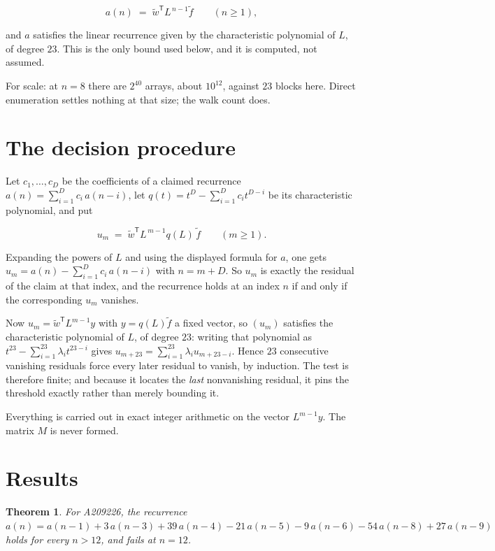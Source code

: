 \documentclass[11pt]{article}
\newtheorem{theorem}{Theorem}
\theoremstyle{definition}
\begin{document}
\[a(n) \;=\; \tilde w^{\mathsf T} L^{\,n-1} \tilde f \qquad (n \ge 1),\]

and $a$ satisfies the linear recurrence given by the characteristic polynomial of $L$, of degree $23$. This is the only bound used below, and it is computed, not assumed.

For scale: at $n = 8$ there are $2^{40}$ arrays, about $10^{12}$, against $23$ blocks here. Direct enumeration settles nothing at that size; the walk count does.

\section{The decision procedure}

Let $c_1,\dots,c_D$ be the coefficients of a claimed recurrence $a(n) = \sum_{i=1}^{D} c_i\,a(n-i)$, let $q(t) = t^{D} - \sum_{i=1}^{D} c_i t^{D-i}$ be its characteristic polynomial, and put

\[u_m \;=\; \tilde w^{\mathsf T} L^{\,m-1} q(L)\,\tilde f \qquad (m \ge 1).\]

Expanding the powers of $L$ and using the displayed formula for $a$, one gets $u_m = a(n) - \sum_{i=1}^{D} c_i\,a(n-i)$ with $n = m + D$. So $u_m$ is exactly the residual of the claim at that index, and the recurrence holds at an index $n$ if and only if the corresponding $u_m$ vanishes.

Now $u_m = \tilde w^{\mathsf T} L^{m-1} y$ with $y = q(L)\tilde f$ a fixed vector, so $(u_m)$ satisfies the characteristic polynomial of $L$, of degree $23$: writing that polynomial as $t^{23} - \sum_{i=1}^{23} \lambda_i t^{23-i}$ gives $u_{m+23} = \sum_{i=1}^{23} \lambda_i u_{m+23-i}$. Hence $23$ consecutive vanishing residuals force every later residual to vanish, by induction. The test is therefore finite; and because it locates the {\itshape last} nonvanishing residual, it pins the threshold exactly rather than merely bounding it.

Everything is carried out in exact integer arithmetic on the vector $L^{m-1}y$. The matrix $M$ is never formed.

\section{Results}

\begin{theorem} For A209226, the recurrence $a(n) = a(n-1) + 3\,a(n-3) + 39\,a(n-4) - 21\,a(n-5) - 9\,a(n-6) - 54\,a(n-8) + 27\,a(n-9)$ holds for every $n > 12$, and fails at $n = 12$.\end{theorem}
\end{document}
